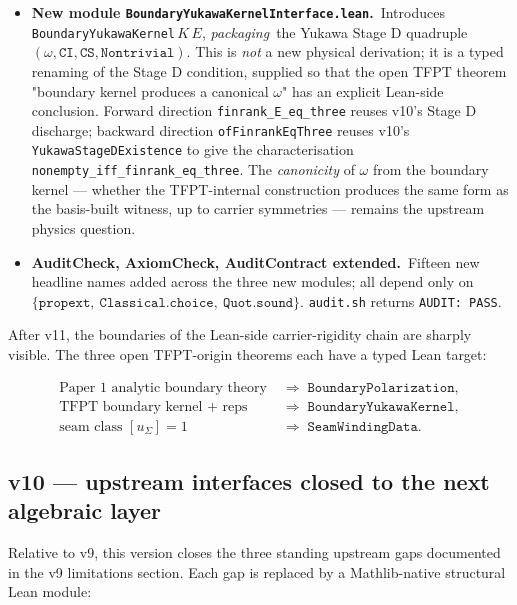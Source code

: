 \documentclass[11pt,a4paper]{article}
\begin{document}
\begin{itemize}[leftmargin=1.6em, itemsep=2pt]
\item \textbf{New module \texttt{BoundaryYukawaKernelInterface.lean}.}\
    Introduces \texttt{BoundaryYukawaKernel}\,$K\,E$,
    \emph{packaging}\ the Yukawa Stage D quadruple
    $(\omega, \texttt{CI}, \texttt{CS}, \texttt{Nontrivial})$.
    This is \emph{not} a new physical derivation; it is a
    typed renaming of the Stage D condition, supplied so that
    the open TFPT theorem
    "boundary kernel produces a canonical $\omega$" has an
    explicit Lean-side conclusion. Forward direction
    \texttt{finrank\_E\_eq\_three} reuses v10's Stage D
    discharge; backward direction \texttt{ofFinrankEqThree}
    reuses v10's \texttt{YukawaStageDExistence} to give the
    characterisation
    \texttt{nonempty\_iff\_finrank\_eq\_three}. The
    \emph{canonicity} of $\omega$ from the boundary kernel
    --- whether the TFPT-internal construction produces the
    same form as the basis-built witness, up to carrier
    symmetries --- remains the upstream physics question.

\item \textbf{AuditCheck, AxiomCheck, AuditContract extended.}\
    Fifteen new headline names added across the three new
    modules; all depend only on
    $\{\texttt{propext},\ \texttt{Classical.choice},\
    \texttt{Quot.sound}\}$. \texttt{audit.sh} returns
    \texttt{AUDIT:\ PASS}.
\end{itemize}

\smallskip
After v11, the boundaries of the Lean-side carrier-rigidity
chain are sharply visible. The three open TFPT-origin theorems
each have a typed Lean target:

\[
\begin{aligned}
\text{Paper 1 analytic boundary theory}
&\;\Rightarrow\; \texttt{BoundaryPolarization}, \\
\text{TFPT boundary kernel + reps}
&\;\Rightarrow\; \texttt{BoundaryYukawaKernel}, \\
\text{seam class }[u_\Sigma] = 1
&\;\Rightarrow\; \texttt{SeamWindingData}.
\end{aligned}
\]

\subsection*{v10 --- upstream interfaces closed to the next
algebraic layer}

Relative to v9, this version closes the three standing upstream
gaps documented in the v9 limitations section. Each gap is
replaced by a Mathlib-native structural Lean module:
\end{document}
